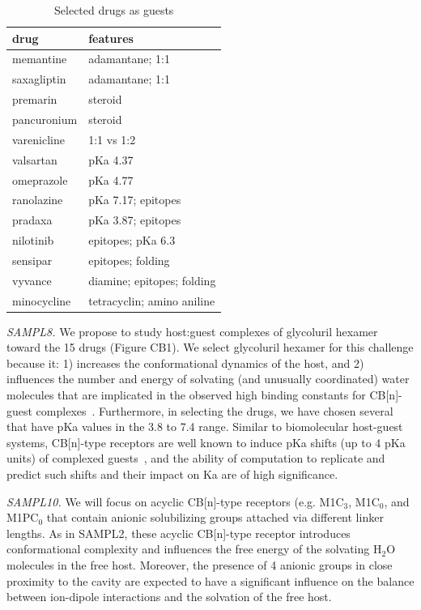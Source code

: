 \documentclass[11pt]{article}
\begin{document}
\begin{table}
\begin{tabular}{l | l}
{\bf drug} & {\bf features} \\
\hline
memantine & adamantane; 1:1 \\
saxagliptin & adamantane; 1:1 \\
premarin & steroid \\
pancuronium & steroid\\
varenicline & 1:1 vs 1:2 \\
valsartan & pKa 4.37 \\ 
omeprazole & pKa 4.77 \\
ranolazine & pKa 7.17; epitopes \\
pradaxa & pKa 3.87; epitopes \\
nilotinib & epitopes; pKa 6.3 \\
sensipar & epitopes; folding \\
vyvance & diamine; epitopes; folding \\
minocycline & tetracyclin; amino aniline \\
\end{tabular}
\caption{\label{table:CB} Selected drugs as guests }
\end{table}

\emph{SAMPL8.} 
We propose to study host:guest complexes of glycoluril hexamer toward the 15 drugs (Figure CB1).  
We select glycoluril hexamer for this challenge because it: 1) increases the conformational dynamics of the host, and 2) influences the number and energy of solvating (and unusually coordinated) water molecules that are implicated in the observed high binding constants for CB[n]-guest complexes~\cite{biedermann_release_2012, biedermann_hydrophobic_2014}.  
Furthermore, in selecting the drugs, we have chosen several that have pKa values in the 3.8 to 7.4 range.  
Similar to biomolecular host-guest systems, CB[n]-type receptors are well known to induce pKa shifts (up to 4 pKa units) of complexed guests~\cite{saleh_activation_2008, nau_deep_2011, ghosh_strategic_2012}, and the ability of computation to replicate and predict such shifts and their impact on Ka are of high significance.
 
\emph{SAMPL10.} 
We will focus on acyclic CB[n]-type receptors (e.g. M1C$_3$, M1C$_0$, and M1PC$_0$ that contain anionic solubilizing groups attached via different linker lengths.  
As in SAMPL2, these acyclic CB[n]-type receptor introduces conformational complexity and influences the free energy of the solvating H$_2$O molecules in the free host.  
Moreover, the presence of 4 anionic groups in close proximity to the cavity are expected to have a significant influence on the balance between ion-dipole interactions and the solvation of the free host.
\end{document}
